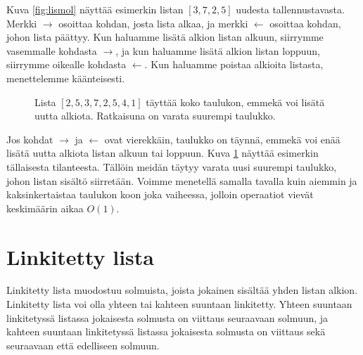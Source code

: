 Kuva \ref{fig:lismol} näyttää esimerkin listan $[3,7,2,5]$
uudesta tallennustavasta.
Merkki $\rightarrow$ osoittaa kohdan, josta lista alkaa,
ja merkki $\leftarrow$ osoittaa kohdan, johon lista päättyy.
Kun haluamme lisätä alkion listan alkuun,
siirrymme vasemmalle kohdasta $\rightarrow$,
ja kun haluamme lisätä alkion listan loppuun,
siirrymme oikealle kohdasta $\leftarrow$.
Kun haluamme poistaa alkioita listasta,
menettelemme käänteisesti.

\begin{figure}
\center
{}
\caption{Lista $[2,5,3,7,2,5,4,1]$ täyttää koko taulukon, emmekä voi lisätä uutta alkiota.
Ratkaisuna on varata suurempi taulukko.}
\label{fig:lismol2}
\end{figure}

Jos kohdat $\rightarrow$ ja $\leftarrow$ ovat vierekkäin,
taulukko on täynnä, emmekä voi enää lisätä uutta alkiota
listan alkuun tai loppuun.
Kuva \ref{fig:lismol2} näyttää esimerkin tällaisesta tilanteesta.
Tällöin meidän täytyy varata uusi suurempi taulukko,
johon listan sisältö siirretään.
Voimme menetellä samalla tavalla kuin aiemmin ja
kaksinkertaistaa taulukon koon joka vaiheessa,
jolloin operaatiot vievät keskimäärin aikaa $O(1)$.

\section{Linkitetty lista}

Linkitetty lista muodostuu solmuista, joista jokainen sisältää
yhden listan alkion.
Linkitetty lista voi olla yhteen tai kahteen suuntaan linkitetty.
Yhteen suuntaan linkitetyssä listassa jokaisesta solmusta
on viittaus seuraavaan solmuun, ja kahteen suuntaan linkitetyssä
listassa jokaisesta solmusta on viittaus sekä seuraavaan että edelliseen solmuun.

